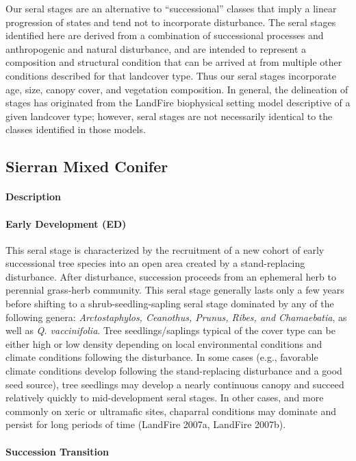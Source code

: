 Our seral stages are an alternative to ``successional'' classes that imply a linear progression of states and tend not to incorporate disturbance. The seral stages identified here are derived from a combination of successional processes and anthropogenic and natural disturbance, and are intended to represent a composition and structural condition that can be arrived at from multiple other conditions described for that landcover type. Thus our seral stages incorporate age, size, canopy cover, and vegetation composition. In general, the delineation of stages has originated from the LandFire biophysical setting model descriptive of a given landcover type; however, seral stages are not necessarily identical to the classes identified in those models.


\subsection*{Sierran Mixed Conifer }

\paragraph{Description}
\paragraph{Early Development (ED)} This seral stage is characterized by the recruitment of a new cohort of early successional tree species into an open area created by a stand-replacing disturbance. After disturbance, succession proceeds from an ephemeral herb to perennial grass-herb community. This seral stage generally lasts only a few years before shifting to a shrub-seedling-sapling seral stage dominated by any of the following genera: \emph{Arctostaphylos, Ceanothus, Prunus, Ribes, and Chamaebatia}, as well as \emph{Q. vaccinifolia}. Tree seedlings/saplings typical of the cover type can be either high or low density depending on local environmental conditions and climate conditions following the disturbance. In some cases (e.g., favorable climate conditions develop following the stand-replacing disturbance and a good seed source), tree seedlings may develop a nearly continuous canopy and succeed relatively quickly to mid-development seral stages. In other cases, and more commonly on xeric or ultramafic sites, chaparral conditions may dominate and persist for long periods of time (LandFire 2007a, LandFire 2007b).

\paragraph{Succession Transition}

